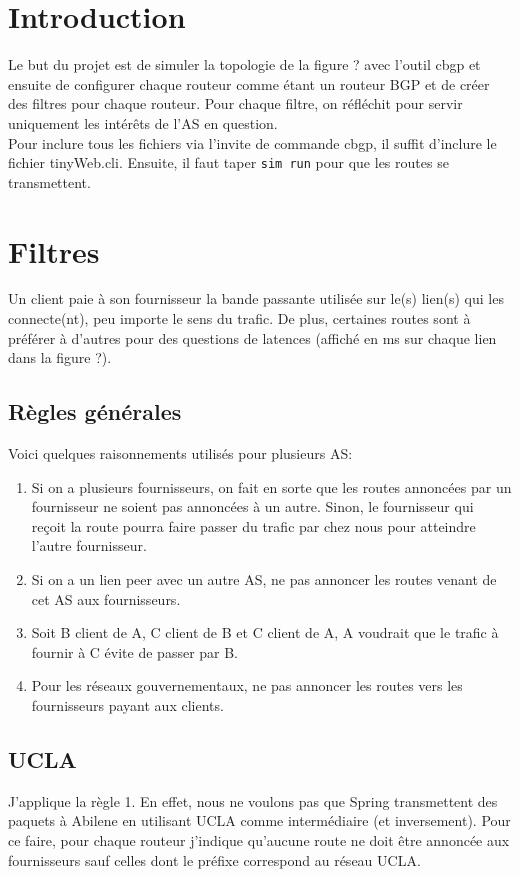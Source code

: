 \documentclass[a4paper, 12pt]{article}
\begin{document}


\section{Introduction}
Le but du projet est de simuler la topologie de la figure ? avec l'outil cbgp et ensuite de configurer chaque routeur comme étant un routeur BGP et de créer des filtres pour chaque routeur.
Pour chaque filtre, on réfléchit pour servir uniquement les intérêts de l'AS en question.
\\

Pour inclure tous les fichiers via l'invite de commande cbgp, il suffit d'inclure le fichier tinyWeb.cli.
Ensuite, il faut taper \texttt{sim run} pour que les routes se transmettent.
\section{Filtres}
Un client paie à son fournisseur la bande passante utilisée sur le(s) lien(s) qui les connecte(nt), peu importe le sens du trafic.
De plus, certaines routes sont à préférer à d'autres pour des questions de latences (affiché en ms sur chaque lien dans la figure ?).
\subsection{Règles générales}
Voici quelques raisonnements utilisés pour plusieurs AS:
\begin{enumerate}
 \item Si on a plusieurs fournisseurs, on fait en sorte que les routes annoncées par un fournisseur ne soient pas annoncées à un autre.
 Sinon, le fournisseur qui reçoit la route pourra faire passer du trafic par chez nous pour atteindre l'autre fournisseur.
 \item Si on a un lien peer avec un autre AS, ne pas annoncer les routes venant de cet AS aux fournisseurs.
 \item Soit B client de A, C client de B et C client de A, A voudrait que le trafic à fournir à C évite de passer par B. %
 \item Pour les réseaux gouvernementaux, ne pas annoncer les routes vers les fournisseurs payant aux clients.
\end{enumerate}

\subsection{UCLA}
J'applique la règle 1.
En effet, nous ne voulons pas que Spring transmettent des paquets à Abilene en utilisant UCLA comme intermédiaire (et inversement).
Pour ce faire, pour chaque routeur j'indique qu'aucune route ne doit être annoncée aux fournisseurs sauf celles dont le préfixe correspond au réseau UCLA.
\end{document}
